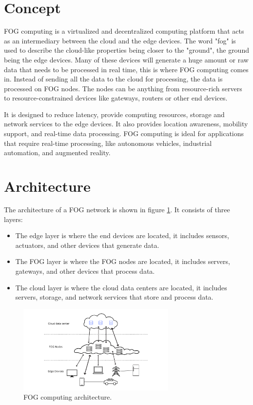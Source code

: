 \section{Concept}
\label{sec:fog-concept}

FOG computing is a virtualized and decentralized computing platform that acts as an intermediary between the cloud and
the edge devices. The word "fog" is used to describe the cloud-like properties being closer to the "ground", the ground
being the edge devices. Many of these devices will generate a huge amount or raw data that needs to be processed in real
time, this is where FOG computing comes in. Instead of sending all the data to the cloud for processing, the data is
processed on FOG nodes. The nodes can be anything from resource-rich servers to resource-constrained devices like
gateways, routers or other end devices.

It is designed to reduce latency, provide computing resources, storage and network services to the edge
devices. It also provides location awareness, mobility support, and real-time data processing. FOG computing is ideal
for applications that require real-time processing, like autonomous vehicles, industrial automation, and augmented
reality.

\section{Architecture}
\label{sec:fog-architecture}

The architecture of a FOG network is shown in figure \ref{fig:fog-architecture}. It consists of three layers:
\begin{itemize}
	\item The edge layer is where the end devices are located, it includes sensors, actuators, and other devices that
	      generate data.
	\item The FOG layer is where the FOG nodes are located, it includes servers, gateways, and other devices that
	      process data.
	\item The cloud layer is where the cloud data centers are located, it includes servers, storage, and network
	      services that store and process data.
\end{itemize}

\begin{figure}[H]
	\centering
	\includegraphics[width=0.70\textwidth]{../images/FOG_network_ink.png}
	\caption{FOG computing architecture.}
	\label{fig:fog-architecture}
\end{figure}

